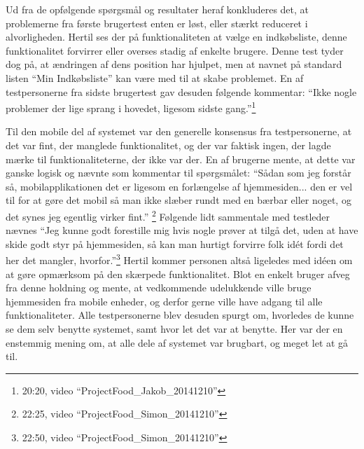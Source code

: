 Ud fra de opfølgende spørgsmål og resultater heraf konkluderes det, at problemerne fra første brugertest enten er løst, eller stærkt reduceret i alvorligheden.
Hertil ses der på funktionaliteten at vælge en indkøbsliste, denne funktionalitet forvirrer eller overses stadig af enkelte brugere. 
Denne test tyder dog på, at ændringen af dens position har hjulpet, men at navnet på standard listen ``Min Indkøbsliste'' kan være med til at skabe problemet.
En af testpersonerne fra sidste brugertest gav desuden følgende kommentar: ``Ikke nogle problemer der lige sprang i hovedet, ligesom sidste gang.''\footnote{20:20, video ``ProjectFood_Jakob_20141210''}

Til den mobile del af systemet var den generelle konsensus fra testpersonerne, at det var fint, der manglede funktionalitet, og der var faktisk ingen, der lagde mærke til funktionaliteterne, der ikke var der. 
En af brugerne mente, at dette var ganske logisk og nævnte som kommentar til spørgsmålet: ``Sådan som jeg forstår så, mobilapplikationen det er ligesom en forlængelse af hjemmesiden... den er vel til for at gøre det mobil så man ikke slæber rundt med en bærbar eller noget, og det synes jeg egentlig virker fint.'' \footnote{22:25, video ``ProjectFood_Simon_20141210''}
Følgende lidt sammentale med testleder nævnes ``Jeg kunne godt forestille mig hvis nogle prøver at tilgå det, uden at have skide godt styr på hjemmesiden, så kan man hurtigt forvirre folk idét fordi det her det mangler, hvorfor.''\footnote{22:50, video ``ProjectFood_Simon_20141210''}
Hertil kommer personen altså ligeledes med idéen om at gøre opmærksom på den skærpede funktionalitet.
Blot en enkelt bruger afveg fra denne holdning og mente, at vedkommende udelukkende ville bruge hjemmesiden fra mobile enheder, og derfor gerne ville have adgang til alle funktionaliteter.
Alle testpersonerne blev desuden spurgt om, hvorledes de kunne se dem selv benytte systemet, samt hvor let det var at benytte.
Her var der en enstemmig mening om, at alle dele af systemet var brugbart, og meget let at gå til.
